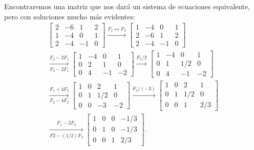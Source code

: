 \documentclass[handout]{beamer} %
\renewcommand{\_}[1]{_{\left[ #1 \right]}}
\renewcommand{\^}[1]{^{\left[ #1 \right]}}
\begin{document}
 \begin{frame}
  	
 	
 	Encontraremos una matriz que nos dará un sistema de ecuaciones equivalente, pero con soluciones mucho más evidentes:
 \pause
 	\begin{multline*}
 	\left[\begin{array}{ccc|c}  2& -6&1& 2 \\ 1&-4 &0&1 \\ 2&-4&-1&0 \end{array}\right]
 	\stackrel{F_1\leftrightarrow F_2}{\longrightarrow} 
 	\left[\begin{array}{ccc|c}  1&-4 &0&1 \\ 2& -6&1&2 \\ 2&-4&-1&0 \end{array}\right]
 	\\
 	\underset{F_3-2 F_1}{\stackrel{F_2-2 F_1}{\longrightarrow} }
 	\left[\begin{array}{ccc|c}  1&-4 &0&1 \\  0& 2&1&0  \\ 0&4&-1&-2 \end{array}\right] 
 	\stackrel{F_2/2}{\longrightarrow} 
 	\left[\begin{array}{ccc|c}  1&-4 &0&1 \\  0& 1&1/2&0  \\ 0&4&-1&-2 \end{array}\right] 
 	\\
 	\underset{F_3 -4F_2}{\stackrel{F_1+4F_2}{\longrightarrow}} 
 	\left[\begin{array}{ccc|c}  1&0 &2&1 \\ 0& 1&1/2&0 \\ 0&0&-3&-2 \end{array}\right] 
 		\stackrel{F_3/(-3)}{\longrightarrow} 
 	\left[\begin{array}{ccc|c}  1&0 &2&1 \\ 0& 1&1/2&0 \\ 0&0&1&2/3 \end{array}\right] 
 	\\
 	\underset{F2 -(1/2)F_3}{\stackrel{F_1-2F_3}{\longrightarrow}} 
 	\left[\begin{array}{ccc|c}  1&0 &0&-1/3 \\ 0& 1&0&-1/3 \\ 0&0&1&2/3 \end{array}\right] .
 	\end{multline*}
\end{frame}
\end{document}
